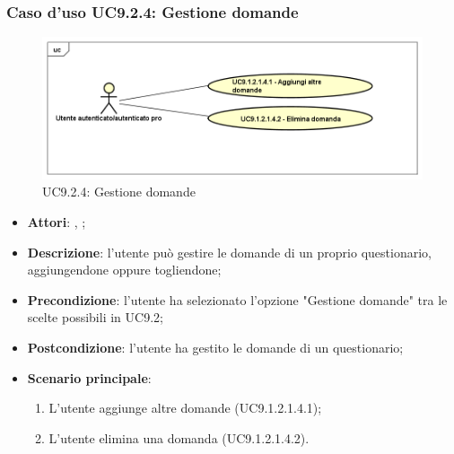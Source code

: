 		\subsubsection{Caso d'uso UC9.2.4: Gestione domande}
		\label{UC9.2.4}
		\begin{figure}[h]
			\centering
			\includegraphics[scale=0.5,keepaspectratio]{UML/UC9_2_4.png}
			\caption{UC9.2.4: Gestione domande}
		\end{figure}
		\FloatBarrier
		\begin{itemize}
			\item \textbf{Attori}: \uau, \uaupro;
			\item \textbf{Descrizione}: l'utente può gestire le domande di un proprio questionario, aggiungendone oppure togliendone;
			\item \textbf{Precondizione}: l'utente ha selezionato l'opzione "Gestione domande" tra le scelte possibili in UC9.2;
			\item \textbf{Postcondizione}: l'utente ha gestito le domande di un questionario;
			\item \textbf{Scenario principale}: 
			\begin{enumerate}
				\item L'utente aggiunge altre domande (UC9.1.2.1.4.1);
				\item L'utente elimina una domanda (UC9.1.2.1.4.2).
			\end{enumerate}
		\end{itemize}
		
